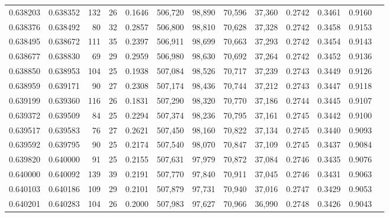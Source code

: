 \begin{tabular}{rrrrrrrrrrrrr}
0.638203 & 0.638352 &    132 &    26 &                                     0.1646 & 506,720 &  98,890 &  70,596 &  37,360 & 0.2742 & 0.3461 & 0.9160 \\
0.638376 & 0.638492 &     80 &    32 &                                     0.2857 & 506,800 &  98,810 &  70,628 &  37,328 & 0.2742 & 0.3458 & 0.9153 \\
0.638495 & 0.638672 &    111 &    35 &                                     0.2397 & 506,911 &  98,699 &  70,663 &  37,293 & 0.2742 & 0.3454 & 0.9143 \\
0.638677 & 0.638830 &     69 &    29 &                                     0.2959 & 506,980 &  98,630 &  70,692 &  37,264 & 0.2742 & 0.3452 & 0.9136 \\
0.638850 & 0.638953 &    104 &    25 &                                     0.1938 & 507,084 &  98,526 &  70,717 &  37,239 & 0.2743 & 0.3449 & 0.9126 \\
0.638959 & 0.639171 &     90 &    27 &                                     0.2308 & 507,174 &  98,436 &  70,744 &  37,212 & 0.2743 & 0.3447 & 0.9118 \\
0.639199 & 0.639360 &    116 &    26 &                                     0.1831 & 507,290 &  98,320 &  70,770 &  37,186 & 0.2744 & 0.3445 & 0.9107 \\
0.639372 & 0.639509 &     84 &    25 &                                     0.2294 & 507,374 &  98,236 &  70,795 &  37,161 & 0.2745 & 0.3442 & 0.9100 \\
0.639517 & 0.639583 &     76 &    27 &                                     0.2621 & 507,450 &  98,160 &  70,822 &  37,134 & 0.2745 & 0.3440 & 0.9093 \\
0.639592 & 0.639795 &     90 &    25 &                                     0.2174 & 507,540 &  98,070 &  70,847 &  37,109 & 0.2745 & 0.3437 & 0.9084 \\
0.639820 & 0.640000 &     91 &    25 &                                     0.2155 & 507,631 &  97,979 &  70,872 &  37,084 & 0.2746 & 0.3435 & 0.9076 \\
0.640000 & 0.640092 &    139 &    39 &                                     0.2191 & 507,770 &  97,840 &  70,911 &  37,045 & 0.2746 & 0.3431 & 0.9063 \\
0.640103 & 0.640186 &    109 &    29 &                                     0.2101 & 507,879 &  97,731 &  70,940 &  37,016 & 0.2747 & 0.3429 & 0.9053 \\
0.640201 & 0.640283 &    104 &    26 &                                     0.2000 & 507,983 &  97,627 &  70,966 &  36,990 & 0.2748 & 0.3426 & 0.9043 \\

\end{tabular}
